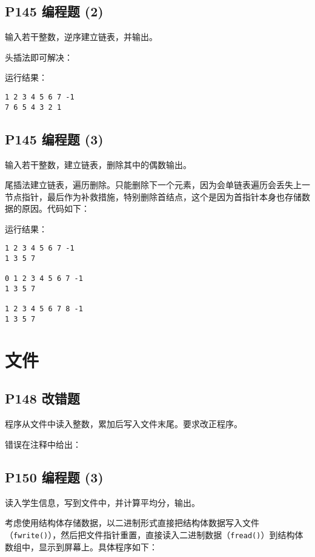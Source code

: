 \documentclass[cs4size,a4paper,nofonts]{ctexart}
\begin{document}
\subsection{P145 编程题 (2)}

输入若干整数，逆序建立链表，并输出。

头插法即可解决：


运行结果：
\begin{verbatim}
1 2 3 4 5 6 7 -1
7 6 5 4 3 2 1
\end{verbatim}

\subsection{P145 编程题 (3)}

输入若干整数，建立链表，删除其中的偶数输出。

尾插法建立链表，遍历删除。只能删除下一个元素，因为会单链表遍历会丢失上一节点指针，最后作为补救措施，特别删除首结点，这个是因为首指针本身也存储数据的原因。代码如下：


运行结果：
\begin{verbatim}
1 2 3 4 5 6 7 -1
1 3 5 7

0 1 2 3 4 5 6 7 -1
1 3 5 7

1 2 3 4 5 6 7 8 -1
1 3 5 7
\end{verbatim}

\section{文件}

\subsection{P148 改错题}

程序从文件中读入整数，累加后写入文件末尾。要求改正程序。

错误在注释中给出：


\subsection{P150 编程题 (3)}

读入学生信息，写到文件中，并计算平均分，输出。

考虑使用结构体存储数据，以二进制形式直接把结构体数据写入文件（{\tt fwrite()}），然后把文件指针重置，直接读入二进制数据（{\tt fread()}）到结构体数组中，显示到屏幕上。具体程序如下：

\end{document}
